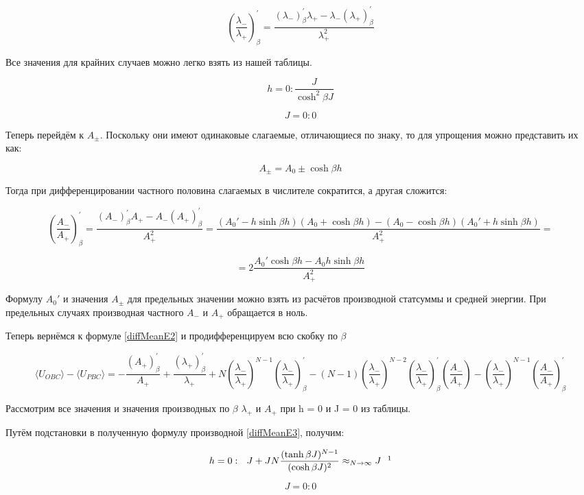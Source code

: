\documentclass{article}
\newcommand{\bj}{\beta J}
\newcommand{\bh}{\beta h}
\newcommand{\lp}{\lambda_{+}}
\newcommand{\lm}{\lambda_{-}}
\newcommand{\ap}{A_{+}}
\newcommand{\am}{A_{-}}
\newcommand{\apm}{A_{\pm}}
\newcommand{\pbc}{_{PBC}}
\newcommand{\obc}{_{OBC}}
\newcommand{\prpb}{^{'}_{\beta}}
\newcommand{\la}{\langle}
\newcommand{\ra}{\rangle}
\numberwithin{equation}{section}
\begin{document}
\[ (\frac{\lm}{\lp})\prpb = \frac{(\lm)\prpb\lp-\lm(\lp)\prpb}{\lp^{2}}\]

Все значения для крайних случаев можно легко взять из нашей таблицы.

\[ h = 0: \frac{J}{\cosh^{2}\bj} \]

\[ J = 0: 0 \]

Теперь перейдём к $\apm$. Поскольку они имеют одинаковые слагаемые, отличающиеся по знаку, то для упрощения можно представить их как:

\[ \apm = A_{0} \pm \cosh{\bh} \]

Тогда при дифференцировании частного половина слагаемых в числителе сократится, а другая сложится:

\[ (\frac{\am}{\ap})\prpb = \frac{(\am)\prpb\ap-\am(\ap)\prpb}{\ap^{2}} = \frac{(A_{0}' - h\sinh{\bh})(A_{0} + \cosh{\bh}) - (A_{0} - \cosh{\bh})(A_{0}'+ h\sinh{\bh})}{\ap^{2}} = \]

\[ = 2\frac{A_{0}'\cosh{\bh} - A_{0}h\sinh{\bh}}{\ap^{2}}\]

Формулу $A_{0}'$ и значения $\apm$ для предельных значении можно взять из расчётов производной статсуммы и средней энергии. При предельных случаях производная частного $\am$ и $\ap$ обращается в ноль.

Теперь вернёмся к формуле \eqref{diffMeanE2} и продифференцируем всю скобку по $\beta$

\begin{equation}\label{diffMeanE3}
    \la U\obc \ra - \la U\pbc \ra = -\frac{(\ap)\prpb}{\ap} + \frac{(\lp)\prpb}{\lp} + N(\frac{\lm}{\lp})^{N-1}(\frac{\lm}{\lp})\prpb - (N-1)(\frac{\lm}{\lp})^{N-2}(\frac{\lm}{\lp})\prpb(\frac{\am}{\ap}) - (\frac{\lm}{\lp})^{N-1}(\frac{\am}{\ap})\prpb
\end{equation}

Рассмотрим все значения и значения производных по $\beta$ $ \lambda_{+}$ и $A_{+}$ при h = 0 и J = 0 из таблицы.

Путём подстановки в полученную формулу производной \eqref{diffMeanE3}, получим:

\[ h = 0:\ \ J + JN\frac{(\tanh{\bj})^{N-1}}{(\cosh{\bj})^{2}} \approx_{N\to\infty} J\ \ \footnotemark\]

\[J = 0: 0\]

\end{document}
